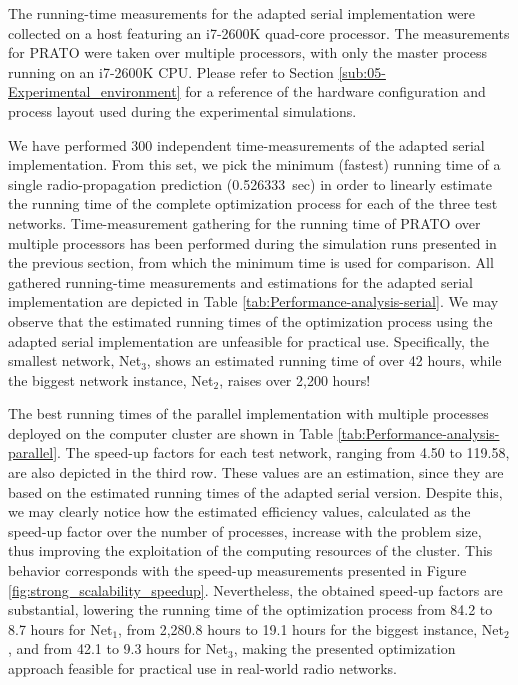 The running-time measurements for the adapted serial implementation
were collected on a host featuring an i7-2600K quad-core processor.
The measurements for PRATO were taken over multiple processors, with
only the master process running on an i7-2600K CPU. Please refer to
Section \ref{sub:05-Experimental_environment} for a reference of
the hardware configuration and process layout used during the experimental
simulations.

We have performed 300 independent time-measurements of the adapted
serial implementation. From this set, we pick the minimum (fastest)
running time of a single radio-propagation prediction (0.526333~sec)
in order to linearly estimate the running time of the complete optimization
process for each of the three test networks. Time-measurement gathering
for the running time of PRATO over multiple processors has been performed
during the simulation runs presented in the previous section, from
which the minimum time is used for comparison. All gathered running-time
measurements and estimations for the adapted serial implementation
are depicted in Table \ref{tab:Performance-analysis-serial}. We may
observe that the estimated running times of the optimization process
using the adapted serial implementation are unfeasible for practical
use. Specifically, the smallest network, Net$_{3}$, shows an estimated
running time of over 42 hours, while the biggest network instance,
Net$_{2}$, raises over 2,200 hours! 

The best running times of the parallel implementation with multiple
processes deployed on the computer cluster are shown in Table \ref{tab:Performance-analysis-parallel}.
The speed-up factors for each test network, ranging from 4.50 to 119.58,
are also depicted in the third row. These values are an estimation,
since they are based on the estimated running times of the adapted
serial version. Despite this, we may clearly notice how the estimated
efficiency values, calculated as the speed-up factor over the number
of processes, increase with the problem size, thus improving the exploitation
of the computing resources of the cluster. This behavior corresponds
with the speed-up measurements presented in Figure \ref{fig:strong_scalability_speedup}.
Nevertheless, the obtained speed-up factors are substantial, lowering
the running time of the optimization process from 84.2 to 8.7 hours
for Net$_{1}$, from 2,280.8 hours to 19.1 hours for the biggest instance,
Net$_{2}$, and from 42.1 to 9.3 hours for Net$_{3}$, making the
presented optimization approach feasible for practical use in real-world
radio networks.

